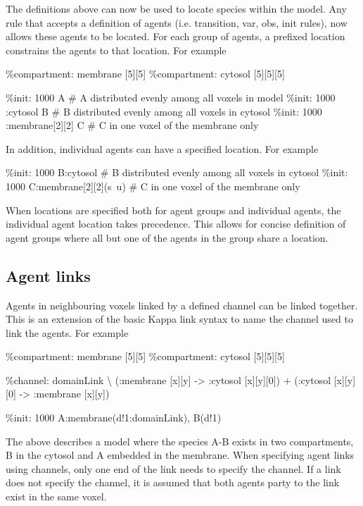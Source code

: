 The definitions above can now be used to locate species within the model. Any rule that accepts a definition of agents (i.e. transition, var, obs, init rules), now allows these agents to be located. For each group of agents, a prefixed location constrains the agents to that location. For example

\begin{kappasource}
\%compartment: membrane [5][5]
\%compartment: cytosol [5][5][5]

\%init: 1000 A                   # A distributed evenly among all voxels in model 
\%init: 1000 :cytosol B          # B distributed evenly among all voxels in cytosol
\%init: 1000 :membrane[2][2] C   # C in one voxel of the membrane only 
\end{kappasource}

In addition, individual agents can have a specified location. For example
\begin{kappasource}
\%init: 1000 B:cytosol             # B distributed evenly among all voxels in cytosol
\%init: 1000 C:membrane[2][2](s~u) # C in one voxel of the membrane only 
\end{kappasource}

When locations are specified both for agent groups and individual agents, the individual agent location takes precedence. This allows for concise definition of agent groups where all but one of the agents in the group share a location.

\subsection{Agent links}

Agents in neighbouring voxels linked by a defined channel can be linked together. This is an extension of the basic Kappa link syntax to name the channel used to link the agents. For example

\begin{kappasource}
\%compartment: membrane [5][5]
\%compartment: cytosol [5][5][5]

\%channel: domainLink {\textbackslash}
    (:membrane [x][y] -> :cytosol [x][y][0]) + (:cytosol [x][y][0] -> :membrane [x][y])

\%init: 1000 A:membrane(d!1:domainLink), B(d!1)
\end{kappasource}

The above describes a model where the species A-B exists in two compartments, B in the cytosol and A embedded in the membrane. When specifying agent links using channels, only one end of the link needs to specify the channel. If a link does not specify the channel, it is assumed that both agents party to the link exist in the same voxel.

